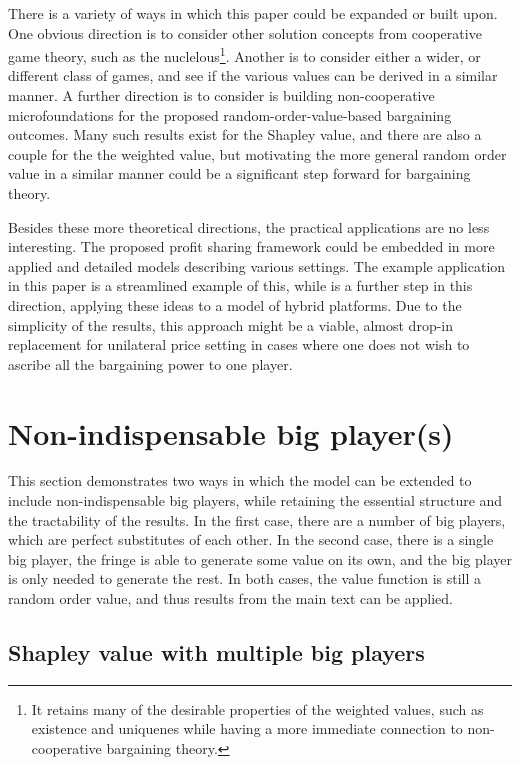 \documentclass[a4paper]{article}
\begin{document}
There is a variety of ways in which this paper could be expanded or built upon.
One obvious direction is to consider other solution concepts from cooperative game theory, such as the nuclelous\footnote{
    It retains many of the desirable properties of the weighted values, such as existence and uniquenes while having a more immediate connection to non-cooperative bargaining theory.
}.
Another is to consider either a wider, or different class of games, and see if the various values can be derived in a similar manner.
A further direction is to consider is building non-cooperative microfoundations for the proposed random-order-value-based bargaining outcomes.
Many such results exist for the Shapley value, and there are also a couple for the the weighted value, but motivating the more general random order value in a similar manner could be a significant step forward for bargaining theory.

Besides these more theoretical directions, the practical applications are no less interesting.
The proposed profit sharing framework could be embedded in more applied and detailed models describing various settings.
The example application in this paper is a streamlined example of this, while \textcite{stancsics2023hybrid} is a further step in this direction, applying these ideas to a model of hybrid platforms.
Due to the simplicity of the results, this approach might be a viable, almost drop-in replacement for unilateral price setting in cases where one does not wish to ascribe all the bargaining power to one player.


\appendix

\printbibliography


\section{Non-indispensable big player(s)}
\label{sec:extensions}

This section demonstrates two ways in which the model can be extended to include non-indispensable big players, while retaining the essential structure and the tractability of the results.
In the first case, there are a number of big players, which are perfect substitutes of each other.
In the second case, there is a single big player, the fringe is able to generate some value on its own, and the big player is only needed to generate the rest.
In both cases, the value function is still a random order value, and thus results from the main text can be applied.

\subsection{Shapley value with multiple big players}
\end{document}
